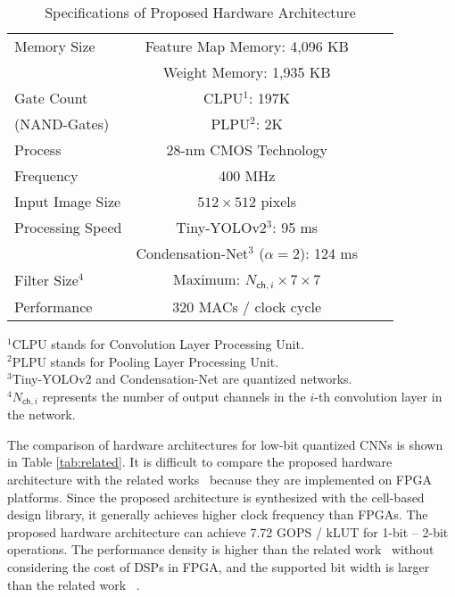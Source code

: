 \documentclass[10pt,twocolumn,letterpaper]{article}
\begin{document}
\begin{table}
\begin{center}
\begin{tabular}{lccc}
\hline
  Memory Size & Feature Map Memory: 4,096 KB   \\
              & Weight Memory: 1,935 KB   \\
\hline
  Gate Count & CLPU$^{1}$: 197K \\
  (NAND-Gates) & PLPU$^{2}$: 2K\\  
\hline
  Process &  28-nm CMOS Technology\\
\hline
  Frequency &  400 MHz\\  
\hline
  Input Image Size & $512 \times 512$ pixels\\
\hline
  Processing Speed & Tiny-YOLOv2$^{3}$: 95 ms\\
                   & Condensation-Net$^{3}$ ($\alpha = 2$): 124 ms\\
\hline
  Filter Size$^{4}$ & Maximum: $N_{\mathsf{ch},i} \times 7 \times 7$\\
\hline
  Performance &   320 MACs / clock cycle\\
\hline
\end{tabular}
\end{center}
{\small
$^{1}$CLPU stands for Convolution Layer Processing Unit.\\
$^{2}$PLPU stands for Pooling Layer Processing Unit.\\
$^{3}$Tiny-YOLOv2 and Condensation-Net are quantized networks.\\
$^{4}N_{\mathsf{ch},i}$ represents the number of output channels in the $i$-th convolution layer in the network.\\
}
\caption{Specifications of Proposed Hardware Architecture}
\label{tab:spec}
\end{table}

The comparison of hardware architectures for low-bit quantized CNNs is shown in Table \ref{tab:related}. It is difficult to compare the proposed hardware architecture with the related works~\cite{li17,zhao17} because they are implemented on FPGA platforms. Since the proposed architecture is synthesized with the cell-based design library, it generally achieves higher clock frequency than FPGAs. The proposed hardware architecture can achieve 7.72 GOPS / kLUT for 1-bit -- 2-bit operations. The performance density is higher than the related work~\cite{zhao17} without considering the cost of DSPs in FPGA, and the supported bit width is larger than the related work ~\cite{li17}.
\end{document}
